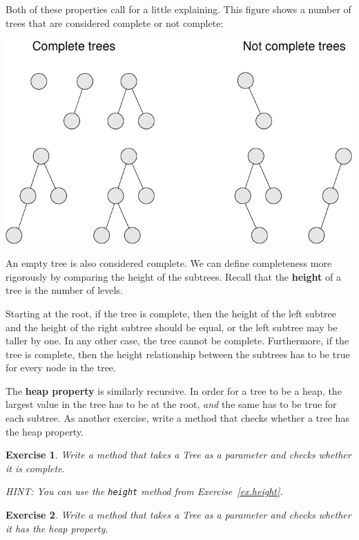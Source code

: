 \documentclass[12pt]{book}
\theoremstyle{exercise}
\newtheorem{exercise}{Exercise}[chapter]
\begin{document}
Both of these properties call for a little explaining.
This figure shows a number of trees that are considered
complete or not complete:
 
\includegraphics{figs/tree4.pdf}
 
An empty tree is also considered complete.  We can define completeness
more rigorously by comparing the height of the subtrees.  Recall that
the {\bf height} of a tree is the number of levels.


Starting at the root, if the tree is complete, then the
height of the left subtree and the height of the right subtree
should be equal, or the left subtree may be taller by one.
In any other case, the tree cannot be complete.
Furthermore, if the tree is complete, then the height
relationship between the subtrees has to be true for every
node in the tree.


The {\bf heap property} is similarly recursive.  In order for a
tree to be a heap, the largest value in the tree has to be at
the root, {\em and} the same has to be true for each subtree.
As another exercise, write a method that checks whether a tree
has the heap property.

\begin{exercise}
Write a method that takes a Tree as a parameter and checks
whether it is complete.

HINT: You can use the {\tt height} method from Exercise~\ref{ex.height}.
\end{exercise}

\begin{exercise}
Write a method that takes a Tree as a parameter and checks
whether it has the heap property.
\end{exercise}
\end{document}
